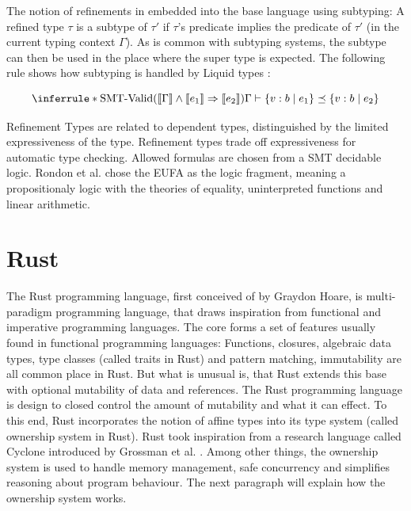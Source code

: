 \documentclass{book}
\theoremstyle{definition}
\begin{document}
The notion of refinements in embedded into the base language using subtyping: A refined type $\tau$ is a subtype of $\tau'$ if $\tau$'s predicate implies the predicate of $\tau'$ (in the current typing context $\Gamma$).
As is common with subtyping systems, the subtype can then be used in the place where the super type is expected.
The following rule shows how subtyping is handled by Liquid types \cite[p. 6]{rondon_liquid_2008}:

\begin{equation*}
  \inferrule*
    {\text{SMT-Valid}(\llbracket \Gamma \rrbracket \wedge \llbracket e_1 \rrbracket \Rightarrow \llbracket e_2 \rrbracket)}
    {\Gamma \vdash \left\{ v : b \mid e_1 \right\} \preceq \left\{ v: b \mid e_2 \right\}}
\end{equation*}

Refinement Types are related to dependent types, distinguished by the limited expressiveness of the type. Refinement types trade off expressiveness for automatic type checking. Allowed formulas are chosen from a SMT decidable logic. 
Rondon et al. \cite{rondon_liquid_2008} chose the EUFA as the logic fragment, meaning a propositionaly logic with the theories of equality, uninterpreted functions and linear arithmetic.


\section{Rust}

The Rust programming language, first conceived of by Graydon Hoare, is multi-paradigm programming language, that draws inspiration from functional and imperative programming languages. The core forms a set of features usually found in functional programming languages: Functions, closures, algebraic data types, type classes (called traits in Rust) and pattern matching, immutability are all common place in Rust.
But what is unusual is, that Rust extends this base with optional mutability of data and references. The Rust programming language is design to closed control the amount of mutability and what it can effect. To this end, Rust incorporates the notion of affine types into its type system (called ownership system in Rust).
Rust took inspiration from a research language called Cyclone introduced by Grossman et al. \cite{grossman_region-based_nodate}.
Among other things, the ownership system is used to handle memory management, safe concurrency and simplifies reasoning about program behaviour.
The next paragraph will explain how the ownership system works.
\end{document}
